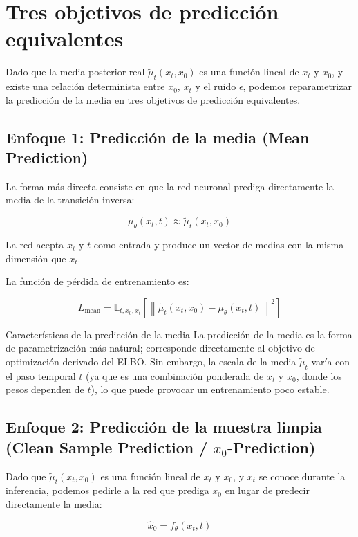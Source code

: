 \section{Tres objetivos de predicción equivalentes}

Dado que la media posterior real $\tilde{\mu}_t(x_t, x_0)$ es una función lineal de $x_t$ y $x_0$, y existe una relación determinista entre $x_0$, $x_t$ y el ruido $\epsilon$, podemos reparametrizar la predicción de la media en tres objetivos de predicción equivalentes.

\subsection{Enfoque 1: Predicción de la media (Mean Prediction)}

La forma más directa consiste en que la red neuronal prediga directamente la media de la transición inversa:

$$\mu_\theta(x_t, t) \approx \tilde{\mu}_t(x_t, x_0)$$

La red acepta $x_t$ y $t$ como entrada y produce un vector de medias con la misma dimensión que $x_t$.

La función de pérdida de entrenamiento es:

$$L_{\text{mean}} = \mathbb{E}_{t, x_0, x_t}\left[\left\| \tilde{\mu}_t(x_t, x_0) - \mu_\theta(x_t, t) \right\|^2\right]$$

\begin{knowledgebox}{Características de la predicción de la media}
La predicción de la media es la forma de parametrización más natural; corresponde directamente al objetivo de optimización derivado del ELBO. Sin embargo, la escala de la media $\tilde{\mu}_t$ varía con el paso temporal $t$ (ya que es una combinación ponderada de $x_t$ y $x_0$, donde los pesos dependen de $t$), lo que puede provocar un entrenamiento poco estable.
\end{knowledgebox}

\subsection{Enfoque 2: Predicción de la muestra limpia (Clean Sample Prediction / $x_0$-Prediction)}

Dado que $\tilde{\mu}_t(x_t, x_0)$ es una función lineal de $x_t$ y $x_0$, y $x_t$ se conoce durante la inferencia, podemos pedirle a la red que prediga $x_0$ en lugar de predecir directamente la media:

$$\hat{x}_0 = f_\theta(x_t, t)$$

